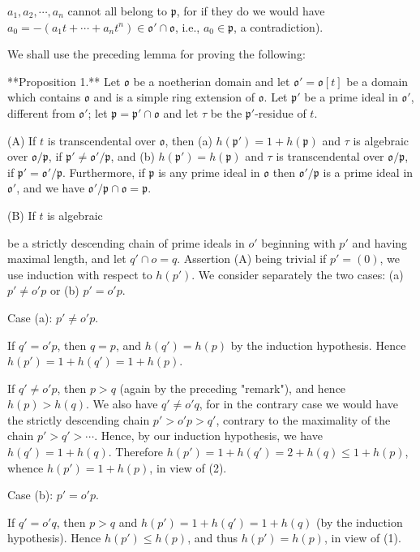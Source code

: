 $a_1, a_2, \cdots, a_n$ cannot all belong to $\mathfrak{p}$, for if they do we would have $a_0 = -(a_1 t + \cdots + a_n t^n) \in \mathfrak{o}' \cap \mathfrak{o}$, i.e., $a_0 \in \mathfrak{p}$, a contradiction).

We shall use the preceding lemma for proving the following:

**Proposition 1.** Let $\mathfrak{o}$ be a noetherian domain and let $\mathfrak{o}' = \mathfrak{o}[t]$ be a domain which contains $\mathfrak{o}$ and is a simple ring extension of $\mathfrak{o}$. Let $\mathfrak{p}'$ be a prime ideal in $\mathfrak{o}'$, different from $\mathfrak{o}'$; let $\mathfrak{p} = \mathfrak{p}' \cap \mathfrak{o}$ and let $\tau$ be the $\mathfrak{p}'$-residue of $t$.

(A) If $t$ is transcendental over $\mathfrak{o}$, then (a) $h(\mathfrak{p}') = 1 + h(\mathfrak{p})$ and $\tau$ is algebraic over $\mathfrak{o}/\mathfrak{p}$, if $\mathfrak{p}' \neq \mathfrak{o}'/\mathfrak{p}$, and (b) $h(\mathfrak{p}') = h(\mathfrak{p})$ and $\tau$ is transcendental over $\mathfrak{o}/\mathfrak{p}$, if $\mathfrak{p}' = \mathfrak{o}'/\mathfrak{p}$. Furthermore, if $\mathfrak{p}$ is any prime ideal in $\mathfrak{o}$ then $\mathfrak{o}'/\mathfrak{p}$ is a prime ideal in $\mathfrak{o}'$, and we have $\mathfrak{o}'/\mathfrak{p} \cap \mathfrak{o} = \mathfrak{p}$.

(B) If $t$ is algebraic

be a strictly descending chain of prime ideals in $o'$ beginning with $p'$ and having maximal length, and let $q' \cap o = q$. Assertion (A) being trivial if $p' = (0)$, we use induction with respect to $h(p')$. We consider separately the two cases: (a) $p' \neq o'p$ or (b) $p' = o'p$.

Case (a): $p' \neq o'p$.

If $q' = o'p$, then $q = p$, and $h(q') = h(p)$ by the induction hypothesis. Hence $h(p') = 1 + h(q') = 1 + h(p)$.

If $q' \neq o'p$, then $p > q$ (again by the preceding "remark"), and hence $h(p) > h(q)$. We also have $q' \neq o'q$, for in the contrary case we would have the strictly descending chain $p' > o'p > q'$, contrary to the maximality of the chain $p' > q' > \cdots$. Hence, by our induction hypothesis, we have $h(q') = 1 + h(q)$. Therefore $h(p') = 1 + h(q') = 2 + h(q) \leq 1 + h(p)$, whence $h(p') = 1 + h(p)$, in view of (2).

Case (b): $p' = o'p$.

If $q' = o'q$, then $p > q$ and $h(p') = 1 + h(q') = 1 + h(q)$ (by the induction hypothesis). Hence $h(p') \leq h(p)$, and thus $h(p') = h(p)$, in view of (1).

